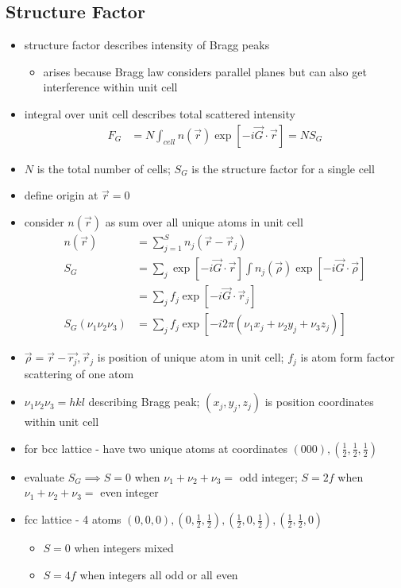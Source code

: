 \documentclass[a4paper,11pt,normalem]{article}
\begin{document}
\subsection{Structure Factor}

\begin{itemize}
    \item structure factor describes intensity of Bragg peaks
        \begin{itemize}
            \item arises because Bragg law considers parallel planes but can also get interference within unit cell
        \end{itemize}
    \item integral over unit cell describes total scattered intensity
        \begin{align*}
            F_G &= N \int_{cell} n(\vec{r}) \exp\left[-i\vec{G}\cdot\vec{r}\right] = NS_G
        \end{align*}
    \item \(N\) is the total number of cells; \(S_G\) is the structure factor for a single cell
    \item define origin at \(\vec{r} = 0\)
    \item consider \(n(\vec{r})\) as sum over all unique atoms in unit cell
        \begin{align*}
            n(\vec{r}) &= \sum_{j=1}^S n_j(\vec{r}-\vec{r}_j) \\
            S_G &= \sum_j \exp\left[-i\vec{G}\cdot\vec{r}\right] \int n_j(\vec{\rho}) \exp\left[-i\vec{G}\cdot\vec{\rho}\right] \\
            &= \sum_j f_j \exp\left[-i\vec{G}\cdot\vec{r}_j\right] \\
            S_G(\nu_1\nu_2\nu_3) &= \sum_j f_j \exp\left[-i2\pi (\nu_1x_j + \nu_2y_j +  \nu_3z_j)\right]
        \end{align*}
    \item \(\vec{\rho} = \vec{r} - \vec{r_j}, \vec{r}_j\) is position of unique atom in unit cell; \(f_j\) is atom form factor scattering of one atom
    \item \(\nu_1\nu_2\nu_3 = hkl\) describing Bragg peak; \((x_j,y_j,z_j)\) is position coordinates within unit cell
    \item for bcc lattice - have two unique atoms at coordinates \((000),(\frac{1}{2},\frac{1}{2},\frac{1}{2})\)
    \item evaluate \(S_G \implies S=0\) when \(\nu_1 + \nu_2+\nu_3 =\) odd integer; \(S=2f\) when \(\nu_1+\nu_2+\nu_3 =\) even integer
    \item fcc lattice - 4 atoms \((0,0,0),(0,\frac{1}{2},\frac{1}{2}),(\frac{1}{2},0,\frac{1}{2}),(\frac{1}{2},\frac{1}{2},0)\)
        \begin{itemize}
            \item \(S = 0\) when integers mixed
            \item \(S=4f\) when integers all odd or all even
        \end{itemize}
\end{itemize}
\end{document}
